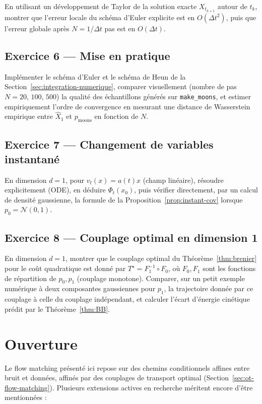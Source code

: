 \documentclass[11pt,a4paper]{article}
\theoremstyle{definition}
\theoremstyle{plain}
\theoremstyle{remark}
\begin{document}
En utilisant un développement de Taylor de la solution exacte $X_{t_{k+1}}$
autour de $t_k$, montrer que l'erreur locale du schéma d'Euler explicite est en
$O(\Delta t^2)$, puis que l'erreur globale après $N=1/\Delta t$ pas est en
$O(\Delta t)$.

\subsection*{Exercice 6 --- Mise en pratique}

Implémenter le schéma d'Euler et le schéma de Heun de la Section~\ref{sec:integration-numerique}, comparer
visuellement (nombre de pas $N=20$, $100$, $500$) la qualité des échantillons
générés sur \texttt{make\_moons}, et estimer empiriquement l'ordre de
convergence en mesurant une distance de Wasserstein empirique entre
$\widehat X_1$ et $p_{\mathrm{moons}}$ en fonction de $N$.

\subsection*{Exercice 7 --- Changement de variables instantané}

En dimension $d=1$, pour $v_t(x)=a(t)x$ (champ linéaire), résoudre
explicitement (ODE), en déduire $\Phi_t(x_0)$, puis vérifier directement, par un
calcul de densité gaussienne, la formule de la Proposition~\ref{prop:instant-cov}
lorsque $p_0=\mathcal{N}(0,1)$.

\subsection*{Exercice 8 --- Couplage optimal en dimension 1}

En dimension $d=1$, montrer que le couplage optimal du Théorème~\ref{thm:brenier}
pour le coût quadratique est donné par $T^\star=F_1^{-1}\circ F_0$, où $F_0,F_1$
sont les fonctions de répartition de $p_0,p_1$ (couplage monotone). Comparer,
sur un petit exemple numérique à deux composantes gaussiennes pour $p_1$, la
trajectoire donnée par ce couplage à celle du couplage indépendant, et calculer
l'écart d'énergie cinétique prédit par le Théorème~\ref{thm:BB}.

\section{Ouverture}

Le flow matching présenté ici repose sur des chemins conditionnels affines
entre bruit et données, affinés par des couplages de transport optimal
(Section~\ref{sec:ot-flow-matching}). Plusieurs extensions actives en recherche
méritent encore d'être mentionnées :
\end{document}
